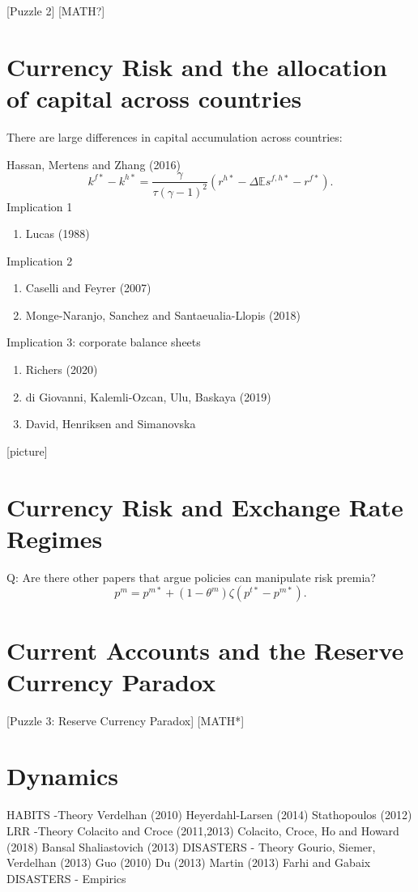 \documentclass{ar-1col}
\begin{document}
[Puzzle 2] [MATH?]

\section{Currency Risk and the allocation of capital across countries}
There are large differences in capital accumulation across countries:

Hassan, Mertens and Zhang (2016)
\begin{equation}\label{eq_link_k_r}
  k^{f\ast}-k^{h\ast} = \frac{\gamma}{\tau(\gamma-1)^2}\left(r^{h \ast} - \Delta \mathbb{E} s^{f, h \ast} - r^{f \ast}\right).
\end{equation}
Implication 1
\begin{enumerate}
\item Lucas (1988)
\end{enumerate}
Implication 2
\begin{enumerate}
\item Caselli and Feyrer (2007)
\item Monge-Naranjo, Sanchez and Santaeualia-Llopis (2018)
\end{enumerate}
Implication 3: corporate balance sheets
\begin{enumerate}
\item Richers (2020)
\item di Giovanni, Kalemli-Ozcan, Ulu, Baskaya (2019)
\item David, Henriksen and Simanovska
\end{enumerate} [picture]
\section{Currency Risk and Exchange Rate Regimes}
Q: Are there other papers that argue policies can manipulate risk
premia?
\begin{equation*}
  p^m = p^{m \ast} + (1 - \theta^m) \zeta (p^{t \ast} - p^{m \ast}).
\end{equation*}
\section{Current Accounts and the Reserve Currency Paradox}
[Puzzle 3: Reserve Currency Paradox] [MATH*]

\section{Dynamics}

HABITS -Theory Verdelhan (2010) Heyerdahl-Larsen (2014) Stathopoulos
(2012) LRR -Theory Colacito and Croce (2011,2013) Colacito, Croce, Ho
and Howard (2018) Bansal Shaliastovich (2013) DISASTERS - Theory
Gourio, Siemer, Verdelhan (2013) Guo (2010) Du (2013) Martin (2013)
Farhi and Gabaix DISASTERS - Empirics
\end{document}
